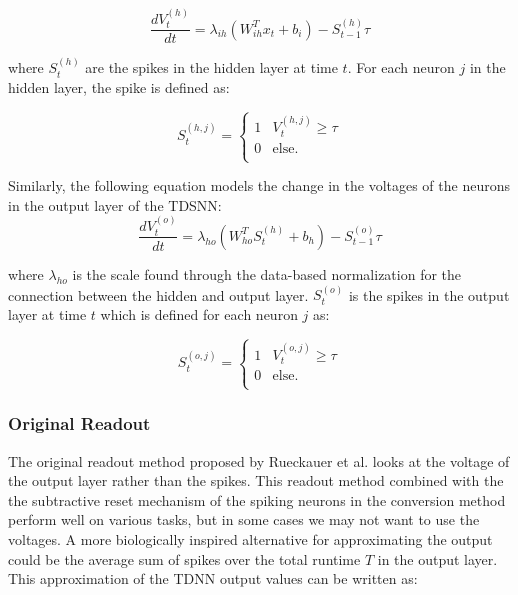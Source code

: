 \documentclass{article}
\begin{document}
\begin{equation}
    \frac{dV^{\left(h\right)}_t}{dt} = \lambda_{ih}\left(W_{ih}^Tx_t + b_i\right) - S^{\left(h\right)}_{t-1}\tau
\end{equation}

where $S^{\left(h\right)}_{t}$ are the spikes in the hidden layer at time $t$. For each neuron $j$ in the hidden layer, the spike is defined as:

\begin{equation}
    S^{\left(h,j\right)}_{t} = \begin{cases} 1 & V^{\left(h,j\right)}_{t}\geq \tau \\
      0 & \text{else.} \\ \end{cases}
\end{equation}

Similarly, the following equation models the change in the voltages of the neurons in the output layer of the TDSNN:
\begin{equation}
    \frac{dV^{\left(o\right)}_t}{dt} = \lambda_{ho} \left(W_{ho}^TS^{\left(h\right)}_{t} + b_h\right) - S^{\left(o\right)}_{t-1} \tau
\end{equation}

where $\lambda_{ho}$ is the scale found through the data-based normalization for the connection between the hidden and output layer. $S^{\left(o\right)}_{t}$ is the spikes in the output layer at time $t$ which is defined for each neuron $j$ as:

\begin{equation}
    S^{\left(o,j\right)}_{t} = \begin{cases} 1 & V^{\left(o,j\right)}_{t}\geq \tau \\
      0 & \text{else.} \\ \end{cases}
\end{equation}

\subsubsection*{Original Readout}
The original readout method proposed by Rueckauer et al. looks at the voltage of the output layer rather than the spikes. This readout method combined with the the subtractive reset mechanism of the spiking neurons in the conversion method perform well on various tasks, \cite{rueckauer2017conversion} but in some cases we may not want to use the voltages. A more biologically inspired alternative for approximating the output could be the average sum of spikes over the total runtime $T$ in the output layer. This approximation of the TDNN output values can be written as:
\end{document}
